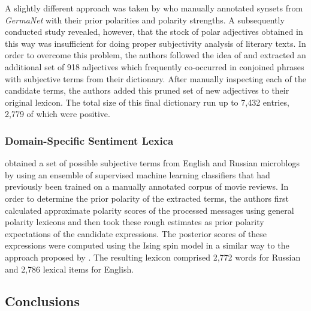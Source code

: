 A slightly different approach was taken by \citet{Clematide:10} who
manually annotated synsets from \emph{GermaNet} \cite{Hamp:97} with
their prior polarities and polarity strengths.  A subsequently
conducted study revealed, however, that the stock of polar adjectives
obtained in this way was insufficient for doing proper subjectivity
analysis of literary texts.  In order to overcome this problem, the
authors followed the idea of \citet{Hatzivassi:97} and extracted an
additional set of 918 adjectives which frequently co-occurred in
conjoined phrases with subjective terms from their dictionary.  After
manually inspecting each of the candidate terms, the authors added
this pruned set of new adjectives to their original lexicon.  The
total size of this final dictionary run up to 7,432 entries, 2,779 of
which were positive.

\subsubsection{Domain-Specific Sentiment Lexica}

\citet{Chetviorkin:14} obtained a set of possible subjective terms
from English and Russian microblogs by using an ensemble of supervised
machine learning classifiers that had previously been trained on a
manually annotated corpus of movie reviews.  In order to determine the
prior polarity of the extracted terms, the authors first calculated
approximate polarity scores of the processed messages using general
polarity lexicons and then took these rough estimates as prior
polarity expectations of the candidate expressions.  The posterior
scores of these expressions were computed using the Ising spin model
in a similar way to the approach proposed by \citet{Takamura:05}.  The
resulting lexicon comprised 2,772 words for Russian and 2,786 lexical
items for English.


\subsection{Conclusions}
